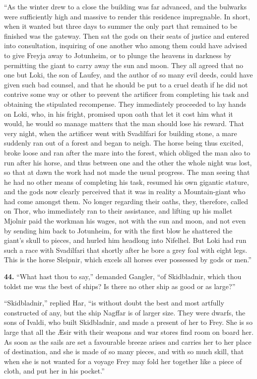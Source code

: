 ``As the winter drew to a close the building was far advanced, and the
bulwarks were sufficiently high and massive to render this residence
impregnable. In short, when it wanted but three days to summer the
only part that remained to be finished was the gateway. Then sat the
gods on their seats of justice and entered into consultation,
inquiring of one another who among them could have advised to give
Freyja away to Jotunheim, or to plunge the heavens in darkness by
permitting the giant to carry away the sun and moon. They all agreed
that no one but Loki, the son of Laufey, and the author of so many
evil deeds, could have given such bad counsel, and that he should be
put to a cruel death if he did not contrive some way or other to
prevent the artificer from completing his task and obtaining the
stipulated recompense. They immediately proceeded to lay hands on
Loki, who, in his fright, promised upon oath that let it cost him what
it would, he would so manage matters that the man should lose his
reward. That very night, when the artificer went with Svadilfari for
building stone, a mare suddenly ran out of a forest and began to
neigh. The horse being thus excited, broke loose and ran after the
mare into the forest, which obliged the man also to run after his
horse, and thus between one and the other the whole night was lost, so
that at dawn the work had not made the usual progress. The man seeing
that he had no other means of completing his task, resumed his own
gigantic stature, and the gods now clearly perceived that it was in
reality a Mountain-giant who had come amongst them. No longer
regarding their oaths, they, therefore, called on Thor, who
immediately ran to their assistance, and lifting up his mallet Mjolnir
paid the workman his wages, not with the sun and moon, and not even by
sending him back to Jotunheim, for with the first blow he shattered
the giant's skull to pieces, and hurled him headlong into Nifelhel.
But Loki had run such a race with Svadilfari that shortly after he
bore a grey foal with eight legs. This is the horse Sleipnir, which
excels all horses ever possessed by gods or men.''


\textbf{44.} ``What hast thou to say,'' demanded Gangler, ``of Skidbladnir,
which thou toldst me was the best of ships? Is there no other ship as
good or as large?''

``Skidbladnir,'' replied Har, ``is without doubt the best and most
artfully constructed of any, but the ship Nagffar is of larger size.
They were dwarfs, the sons of Ivaldi, who built Skidbladnir, and made
a present of her to Frey. She is so large that all the Æsir with their
weapons and war stores find room on board her. As soon as the sails
are set a favourable breeze arises and carries her to her place of
destination, and she is made of so many pieces, and with so much
skill, that when she is not wanted for a voyage Frey may fold her
together like a piece of cloth, and put her in his pocket.''

